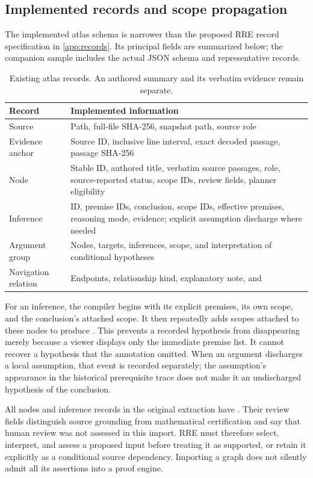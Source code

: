 \subsection{Implemented records and scope propagation}

The implemented atlas schema is narrower than the proposed RRE record specification in \cref{app:records}. Its principal fields are summarized below; the companion sample includes the actual JSON schema and representative records.

\begin{table}[htbp]
\centering\small
\begin{tabularx}{\linewidth}{@{}p{2.2cm}Y@{}}
\toprule
Record & Implemented information \\
\midrule
Source & Path, full-file SHA-256, snapshot path, source role \\
Evidence anchor & Source ID, inclusive line interval, exact decoded passage, passage SHA-256 \\
Node & Stable ID, authored title, verbatim source passages, role, source-reported status, scope IDs, review fields, planner eligibility \\
Inference & ID, premise IDs, conclusion, scope IDs, effective premises, reasoning mode, evidence; explicit assumption discharge where needed \\
Argument group & Nodes, targets, inferences, scope, and interpretation of conditional hypotheses \\
Navigation relation & Endpoints, relationship kind, explanatory note, and  \\
\bottomrule
\end{tabularx}
\caption{Existing atlas records. An authored summary and its verbatim evidence remain separate.}
\end{table}

For an inference, the compiler begins with its explicit premises, its own scope, and the conclusion's attached scope. It then repeatedly adds scopes attached to these nodes to produce . This prevents a recorded hypothesis from disappearing merely because a viewer displays only the immediate premise list. It cannot recover a hypothesis that the annotation omitted. When an argument discharges a local assumption, that event is recorded separately; the assumption's appearance in the historical prerequisite trace does not make it an undischarged hypothesis of the conclusion.

All nodes and inference records in the original extraction have . Their review fields distinguish source grounding from mathematical certification and say that human review was not assessed in this import. RRE must therefore select, interpret, and assess a proposed input before treating it as supported, or retain it explicitly as a conditional source dependency. Importing a graph does not silently admit all its assertions into a proof engine.

